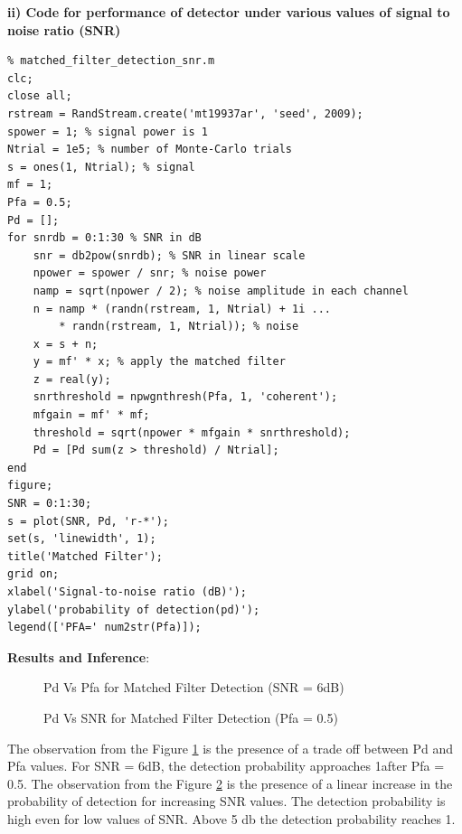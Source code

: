 \documentclass[a4paper]{article}
\begin{document}
\textbf{ii) Code for performance of detector under various values of signal to noise ratio (SNR)}\\
\begin{verbatim}
% matched_filter_detection_snr.m
clc;
close all;
rstream = RandStream.create('mt19937ar', 'seed', 2009);
spower = 1; % signal power is 1
Ntrial = 1e5; % number of Monte-Carlo trials
s = ones(1, Ntrial); % signal
mf = 1;
Pfa = 0.5;
Pd = [];
for snrdb = 0:1:30 % SNR in dB
    snr = db2pow(snrdb); % SNR in linear scale
    npower = spower / snr; % noise power
    namp = sqrt(npower / 2); % noise amplitude in each channel
    n = namp * (randn(rstream, 1, Ntrial) + 1i ...
        * randn(rstream, 1, Ntrial)); % noise
    x = s + n;
    y = mf' * x; % apply the matched filter
    z = real(y);
    snrthreshold = npwgnthresh(Pfa, 1, 'coherent');
    mfgain = mf' * mf;
    threshold = sqrt(npower * mfgain * snrthreshold);
    Pd = [Pd sum(z > threshold) / Ntrial];
end
figure;
SNR = 0:1:30;
s = plot(SNR, Pd, 'r-*');
set(s, 'linewidth', 1);
title('Matched Filter');
grid on;
xlabel('Signal-to-noise ratio (dB)');
ylabel('probability of detection(pd)');
legend(['PFA=' num2str(Pfa)]);
\end{verbatim}
\textbf{\large{Results and Inference}}:\\[10pt]
\begin{figure}[h!bt]
  \centering
  
  \caption{Pd Vs Pfa for Matched Filter Detection (SNR = 6dB)}
  \label{fig:2.1}
\end{figure}
\begin{figure}[h!bt]
  \centering
  
  \caption{Pd Vs SNR for Matched Filter Detection (Pfa = 0.5)}
  \label{fig:2.2}
\end{figure}
The observation from the Figure \ref{fig:2.1} is the presence of a trade off between
Pd and Pfa values. For SNR = 6dB, the detection probability approaches
1after Pfa = 0.5. The observation from the Figure \ref{fig:2.2} is the presence of a linear increase in the probability of detection for increasing SNR values. The detection probability
is high even for low values of SNR. Above 5 db the detection probability
reaches 1.
\newpage
\end{document}

